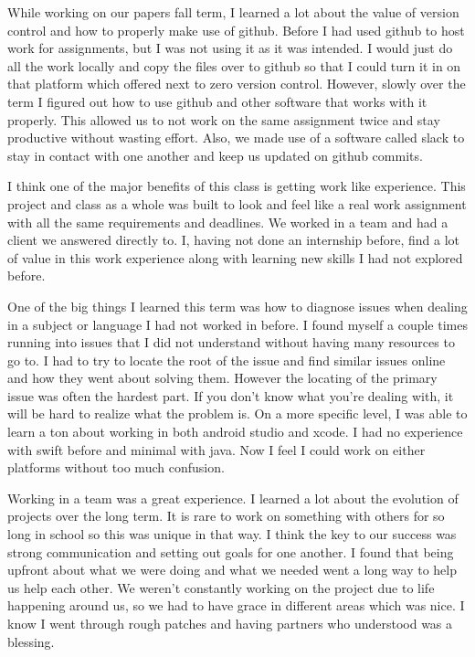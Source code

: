 \documentclass[letterpaper,10pt,draftclsnofoot,onecolumn,titlepage]{IEEEtran}
\begin{document}
	While working on our papers fall term, I learned a lot about the value of version control and how to properly make use of github. 
Before I had used github to host work for assignments, but I was not using it as it was intended. 
I would just do all the work locally and copy the files over to github so that I could turn it in on that platform which offered next to zero version control. 
However, slowly over the term I figured out how to use github and other software that works with it properly. 
This allowed us to not work on the same assignment twice and stay productive without wasting effort. 
Also, we made use of a software called slack to stay in contact with one another and keep us updated on github commits. 

	I think one of the major benefits of this class is getting work like experience. 
This project and class as a whole was built to look and feel like a real work assignment with all the same requirements and deadlines. 
We worked in a team and had a client we answered directly to. I, having not done an internship before, find a lot of value in this work experience along with learning new skills I had not explored before. 

	One of the big things I learned this term was how to diagnose issues when dealing in a subject or language I had not worked in before. 
I found myself a couple times running into issues that I did not understand without having many resources to go to. 
I had to try to locate the root of the issue and find similar issues online and how they went about solving them. 
However the locating of the primary issue was often the hardest part. If you don’t know what you’re dealing with, it will be hard to realize what the problem is.
On a more specific level, I was able to learn a ton about working in both android studio and xcode. 
I had no experience with swift before and minimal with java. 
Now I feel I could work on either platforms without too much confusion.

	Working in a team was a great experience. 
I learned a lot about the evolution of projects over the long term. 
It is rare to work on something with others for so long in school so this was unique in that way. 
I think the key to our success was strong communication and setting out goals for one another. 
I found that being upfront about what we were doing and what we needed went a long way to help us help each other. 
We weren’t constantly working on the project due to life happening around us, so we had to have grace in different areas which was nice. 
I know I went through rough patches and having partners who understood was a blessing. 
\end{document}
